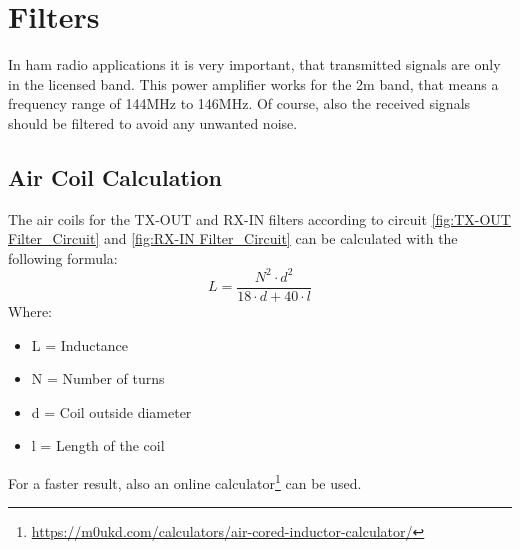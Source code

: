\section{Filters}
In ham radio applications it is very important, that transmitted signals are only in the licensed band. This power amplifier works for the 2m band, that means a frequency range of 144MHz to 146MHz.
Of course, also the received signals should be filtered to avoid any unwanted noise.
\subsection{Air Coil Calculation}
The air coils for the TX-OUT and RX-IN filters according to circuit \ref{fig:TX-OUT Filter_Circuit} and \ref{fig:RX-IN Filter_Circuit} can be calculated with the following formula:
\begin{equation}
	L = \frac{N^{2} \cdot d^{2}}{18 \cdot d + 40 \cdot l}
\end{equation}
 Where:
\begin{itemize}
	\item L = Inductance
	\item N = Number of turns
	\item d = Coil outside diameter
	\item l = Length of the coil
\end{itemize}

\bigskip
For a faster result, also an online calculator\footnote{\url{https://m0ukd.com/calculators/air-cored-inductor-calculator/}} \cite{airCoilCalculator.2015} can be used. 

\newpage
